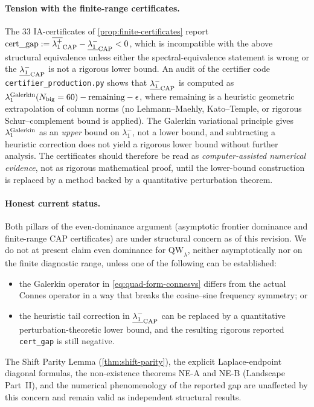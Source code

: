 \documentclass[11pt,a4paper]{article}
\theoremstyle{remark}
\theoremstyle{plain}
\newcommand{\QW}{\mathrm{QW}}
\begin{document}
\paragraph{Tension with the finite-range certificates.}
The 33 IA-certificates of \cref{prop:finite-certificates} report
$\text{cert\_gap} := \overline{\lambda_1^+}_{\rm CAP} - \underline{\lambda_1^-}_{\rm CAP} < 0$,
which is incompatible with the above structural equivalence unless
either the spectral-equivalence statement is wrong or the
$\underline{\lambda_1^-}_{\rm CAP}$ is not a rigorous lower bound. An
audit of the certifier code \texttt{certifier\_production.py} shows
that $\underline{\lambda_1^-}_{\rm CAP}$ is computed as
$\lambda_1^{\rm Galerkin}(N_{\rm big}=60) - \text{remaining} - \epsilon$,
where $\text{remaining}$ is a heuristic geometric extrapolation of
column norms (no Lehmann--Maehly, Kato--Temple, or rigorous
Schur--complement bound is applied). The Galerkin variational
principle gives $\lambda_1^{\rm Galerkin}$ as an \emph{upper} bound on
$\lambda_1^-$, not a lower bound, and subtracting a heuristic
correction does not yield a rigorous lower bound without further
analysis. The certificates should therefore be read as
\emph{computer-assisted numerical evidence}, not as rigorous
mathematical proof, until the lower-bound construction is replaced by
a method backed by a quantitative perturbation theorem.

\paragraph{Honest current status.} Both pillars of the even-dominance
argument (asymptotic frontier dominance and finite-range CAP
certificates) are under structural concern as of this revision. We
do not at present claim even dominance for $\QW_\lambda$, neither
asymptotically nor on the finite diagnostic range, unless one of the
following can be established:
\begin{itemize}[leftmargin=*]
  \item the Galerkin operator in \cref{eq:quad-form-connesvs} differs from the
  actual Connes operator in a way that breaks the cosine--sine
  frequency symmetry; or
  \item the heuristic tail correction in
  $\underline{\lambda_1^-}_{\rm CAP}$ can be replaced by a quantitative
  perturbation-theoretic lower bound, and the resulting rigorous
  reported \texttt{cert\_gap} is still negative.
\end{itemize}
The Shift Parity Lemma (\cref{thm:shift-parity}), the explicit
Laplace-endpoint diagonal formulas, the non-existence theorems NE-A
and NE-B (Landscape Part~II), and the numerical phenomenology of the
reported gap are unaffected by this concern and remain valid as
independent structural results.
\end{document}
